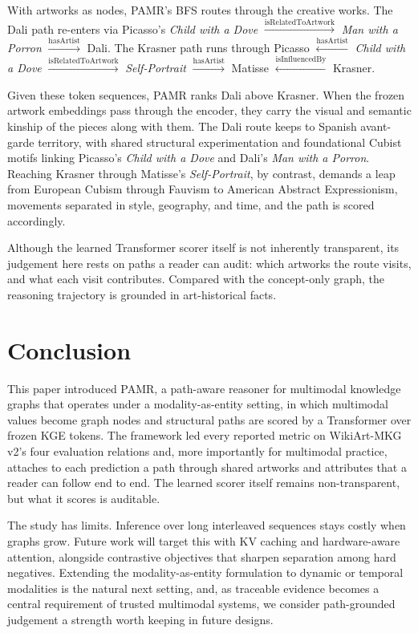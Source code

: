 \documentclass[runningheads]{llncs}
\begin{document}
With artworks as nodes, PAMR's BFS routes through the creative works. The Dali path re-enters via Picasso's \textit{Child with a Dove} $\xrightarrow{\text{isRelatedToArtwork}}$ \textit{Man with a Porron} $\xrightarrow{\text{hasArtist}}$ Dali. The Krasner path runs through Picasso $\xleftarrow{\text{hasArtist}}$ \textit{Child with a Dove} $\xrightarrow{\text{isRelatedToArtwork}}$ \textit{Self-Portrait} $\xrightarrow{\text{hasArtist}}$ Matisse $\xleftarrow{\text{isInfluencedBy}}$ Krasner.

Given these token sequences, PAMR ranks Dali above Krasner. When the frozen artwork embeddings pass through the encoder, they carry the visual and semantic kinship of the pieces along with them. The Dali route keeps to Spanish avant-garde territory, with shared structural experimentation and foundational Cubist motifs linking Picasso's \textit{Child with a Dove} and Dali's \textit{Man with a Porron}. Reaching Krasner through Matisse's \textit{Self-Portrait}, by contrast, demands a leap from European Cubism through Fauvism to American Abstract Expressionism, movements separated in style, geography, and time, and the path is scored accordingly.

Although the learned Transformer scorer itself is not inherently transparent, its judgement here rests on paths a reader can audit: which artworks the route visits, and what each visit contributes. Compared with the concept-only graph, the reasoning trajectory is grounded in art-historical facts.

\section{Conclusion}
\label{sec:conclusion}

This paper introduced PAMR, a path-aware reasoner for multimodal knowledge graphs that operates under a modality-as-entity setting, in which multimodal values become graph nodes and structural paths are scored by a Transformer over frozen KGE tokens. The framework led every reported metric on WikiArt-MKG v2's four evaluation relations and, more importantly for multimodal practice, attaches to each prediction a path through shared artworks and attributes that a reader can follow end to end. The learned scorer itself remains non-transparent, but what it scores is auditable.

The study has limits. Inference over long interleaved sequences stays
costly when graphs grow. Future work will target this with KV caching
and hardware-aware attention, alongside contrastive objectives that
sharpen separation among hard negatives. Extending the modality-as-entity
formulation to dynamic or temporal modalities is the natural next
setting, and, as traceable evidence becomes a central requirement of
trusted multimodal systems, we consider path-grounded judgement a
strength worth keeping in future designs.
\end{document}
